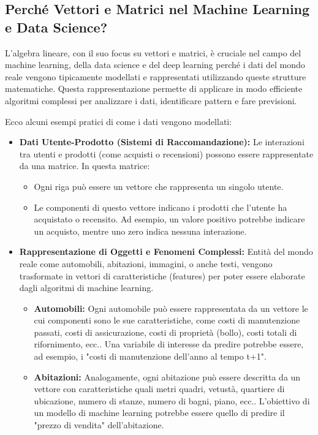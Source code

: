 \documentclass{article}
\begin{document}
\subsection{Perché Vettori e Matrici nel Machine Learning e Data Science?}
L'algebra lineare, con il suo focus su vettori e matrici, è cruciale nel campo del machine learning, della data science e del deep learning perché i dati del mondo reale vengono tipicamente modellati e rappresentati utilizzando queste strutture matematiche. Questa rappresentazione permette di applicare in modo efficiente algoritmi complessi per analizzare i dati, identificare pattern e fare previsioni.

Ecco alcuni esempi pratici di come i dati vengono modellati:

\begin{itemize}
    \item \textbf{Dati Utente-Prodotto (Sistemi di Raccomandazione):}
          Le interazioni tra utenti e prodotti (come acquisti o recensioni) possono essere rappresentate da una matrice. In questa matrice:
          \begin{itemize}
              \item Ogni riga può essere un vettore che rappresenta un singolo utente.
              \item Le componenti di questo vettore indicano i prodotti che l'utente ha acquistato o recensito. Ad esempio, un valore positivo potrebbe indicare un acquisto, mentre uno zero indica nessuna interazione.
          \end{itemize}

    \item \textbf{Rappresentazione di Oggetti e Fenomeni Complessi:}
          Entità del mondo reale come automobili, abitazioni, immagini, o anche testi, vengono trasformate in vettori di caratteristiche (features) per poter essere elaborate dagli algoritmi di machine learning.
          \begin{itemize}
              \item \textbf{Automobili:} Ogni automobile può essere rappresentata da un vettore le cui componenti sono le sue caratteristiche, come costi di manutenzione passati, costi di assicurazione, costi di proprietà (bollo), costi totali di rifornimento, ecc.. Una variabile di interesse da predire potrebbe essere, ad esempio, i "costi di manutenzione dell'anno al tempo t+1".
              \item \textbf{Abitazioni:} Analogamente, ogni abitazione può essere descritta da un vettore con caratteristiche quali metri quadri, vetustà, quartiere di ubicazione, numero di stanze, numero di bagni, piano, ecc.. L'obiettivo di un modello di machine learning potrebbe essere quello di predire il "prezzo di vendita" dell'abitazione.
          \end{itemize}
\end{itemize}
\end{document}

